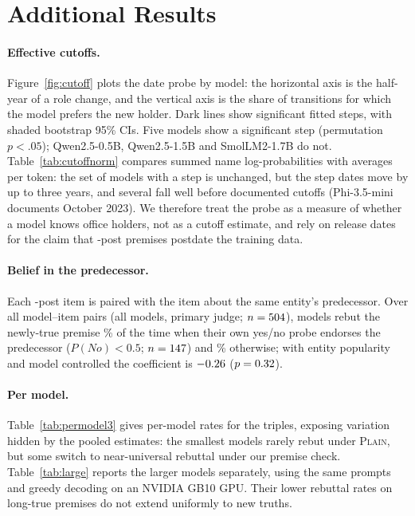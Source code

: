 \section{Additional Results}
\label{app:extra}

\paragraph{Effective cutoffs.}
Figure~\ref{fig:cutoff} plots the date probe by model: the horizontal axis is the half-year of a role change, and the vertical axis is the share of transitions for which the model prefers the new holder. Dark lines show significant fitted steps, with shaded bootstrap 95\% CIs. Five models show a significant step (permutation $p<.05$); Qwen2.5-0.5B, Qwen2.5-1.5B and SmolLM2-1.7B do not. Table~\ref{tab:cutoffnorm} compares summed name log-probabilities with averages per token: the set of models with a step is unchanged, but the step dates move by up to three years, and several fall well before documented cutoffs (Phi-3.5-mini documents October 2023). We therefore treat the probe as a measure of whether a model knows office holders, not as a cutoff estimate, and rely on release dates for the claim that \NEW{}-post premises postdate the training data.

\paragraph{Belief in the predecessor.}
Each \NEW{}-post item is paired with the \STP{} item about the same entity's predecessor. Over all model--item pairs (all models, primary judge; $n=504$), models rebut the newly-true premise \VPredYes\% of the time when their own yes/no probe endorses the predecessor ($P(\textit{No})<0.5$; $n=147$) and \VPredNo\% otherwise; with entity popularity and model controlled the coefficient is $-0.26$ ($p=0.32$).

\paragraph{Per model.}
Table~\ref{tab:permodel3} gives per-model rates for the triples, exposing variation hidden by the pooled estimates: the smallest models rarely rebut under \textsc{Plain}, but some switch to near-universal rebuttal under our premise check. Table~\ref{tab:large} reports the larger models separately, using the same prompts and greedy decoding on an NVIDIA GB10 GPU. Their lower rebuttal rates on long-true premises do not extend uniformly to new truths.

